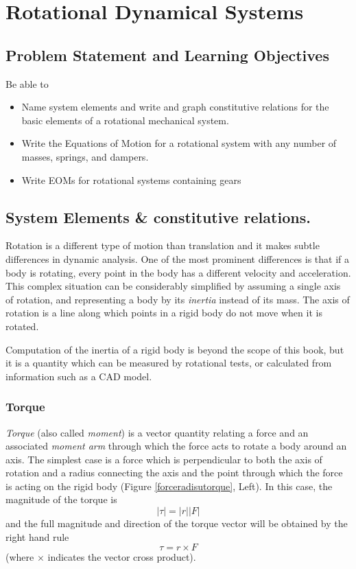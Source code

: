 %
%
%


\chapter{Rotational Dynamical Systems}

\section{Problem Statement and Learning Objectives}
Be able to
\begin{itemize}
  \item Name system elements and write and graph constitutive relations for the basic elements
  of a rotational mechanical system.
  \item Write the Equations of Motion for a rotational system with any number of masses, springs, and dampers. 
  \item Write EOMs for rotational systems containing gears
\end{itemize}
 
\section{System Elements \& constitutive relations.}

Rotation is a different type of motion than translation and it makes subtle differences in dynamic analysis.   One of the most prominent differences is that if a body is rotating, every point in the body has a different velocity and acceleration.   This complex situation can be considerably simplified by assuming a single axis of rotation, and representing a body by its {\it inertia} instead of its mass.   The axis of rotation is a line along which points in a rigid body do not move when it is rotated.

Computation of the inertia of a rigid body is beyond the scope of this book, but it is a quantity which can be measured by rotational tests, or calculated from information such as a CAD model.

\subsection{Torque}

{\it Torque} (also called {\it moment}) is a vector quantity relating a force and an associated {\it moment arm} through which the force acts to rotate a body around an axis.   The simplest case is a force which is perpendicular to both the axis of rotation and a radius connecting the axis and the point through which the force is acting on the rigid body (Figure \ref{forceradisutorque}, Left). In this case, the magnitude of the torque is
\[
|\tau| = |r||F|
\]
and the full magnitude and direction of the torque vector will be obtained by the right hand rule
\[
\tau = r \times F
\]
(where $\times$ indicates the vector cross product).


